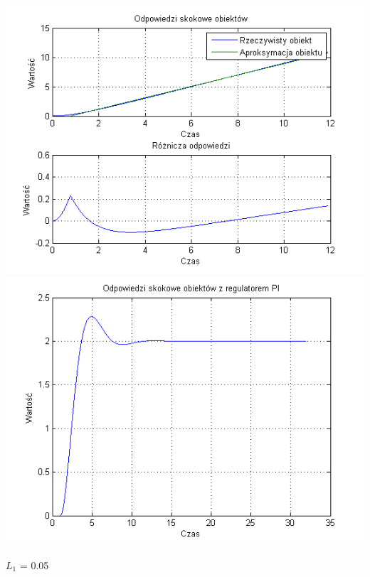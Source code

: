 \documentclass[10pt,a4paper]{article}
\begin{document}
\begin{center}
\includegraphics[scale=1]{images/jeden/skrypt_137.png}\\
\includegraphics[scale=1]{images/jeden/skrypt_138.png}\\
\end{center}
\newpage
$L_1$ = 0.05
\end{document}
